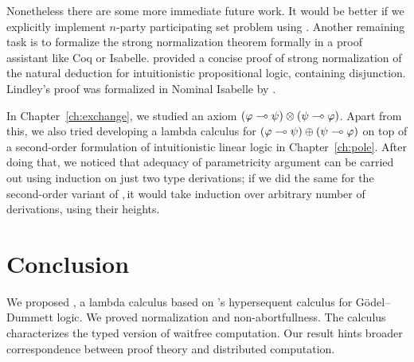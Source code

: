 Nonetheless there are some more immediate future work.
It would be better if we explicitly implement $n$-party participating
set problem using \lgd.
Another remaining task is to formalize the strong normalization theorem
formally in a proof assistant like Coq or Isabelle.
\citet{ttlifting} provided a concise proof of strong normalization of
the natural deduction for
intuitionistic propositional logic, containing disjunction.
Lindley's proof was formalized in Nominal Isabelle by
\citet{Doczkal2009}.

In Chapter~\ref{ch:exchange}, we studied an axiom
$(\varphi\multimap\psi)\otimes(\psi\multimap\varphi)$.
Apart from this, we also tried developing a lambda calculus for
$(\varphi\multimap\psi)\oplus(\psi\multimap\varphi)$ on top of a second-order
formulation of intuitionistic linear logic in Chapter~\ref{ch:pole}.
After doing that, we noticed that adequacy of parametricity argument
can be carried out using induction on just two type derivations;
if we did the same for the second-order variant of \lgd,\,it would take
induction over arbitrary number of derivations, using their heights.

\section{Conclusion}
\label{conc}
We proposed \lgd, a lambda calculus
based on \citet{avron91}'s hypersequent calculus for
G\"odel--Dummett logic.
We proved normalization and non-abortfullness.
The calculus characterizes
the typed version of waitfree computation.
Our result hints broader correspondence between proof theory and distributed computation.

\renewcommand{\comodL}{\comod{c}{\co c}}
\renewcommand{\comodR}{\comod{\co c}{c}}
